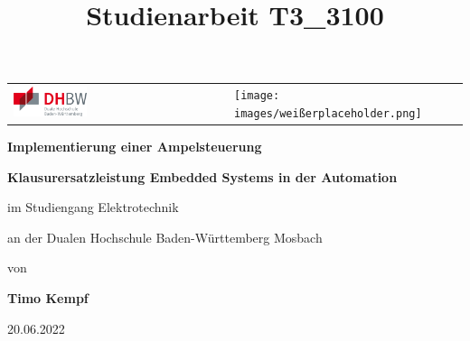 \documentclass[12pt,oneside,a4paper]{scrreprt}
\title{Studienarbeit T3\_3100}
\begin{document}
	\begin{titlepage}
		\begin{table}[H]
			\begin{tabular}{lll}
				\includegraphics[width=0.35\textwidth]{images/DHBW-Logo.png} & \texttt{[image: images/weißerplaceholder.png]}  &                        
			\end{tabular}
		\end{table}
		
		\vspace{2\baselineskip}
		\begin{center}
			{\Large \textbf{Implementierung einer Ampelsteuerung
}}
		\end{center}
		
		
		\vspace{2\baselineskip}
		\begin{center}
			{\large \textbf{Klausurersatzleistung Embedded Systems in der Automation}}
		\end{center}
		
		
		\vspace{2\baselineskip}
		\begin{center}
			im Studiengang Elektrotechnik
		\end{center}
		
		
		\begin{center}
			an der Dualen Hochschule Baden-Württemberg Mosbach
		\end{center}
		
		
		\vspace{0.5\baselineskip}
		\begin{center}
			von
		\end{center}
		
		
		\vspace{0.5\baselineskip}
		\begin{center}
			\textbf{Timo Kempf}
		\end{center}
		
		
		\vspace{1\baselineskip}
		\begin{center}
			20.06.2022
		\end{center}
		

\end{titlepage}
\end{document}
